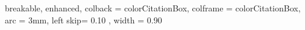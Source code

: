 {
  breakable,
  enhanced,
  colback  = colorCitationBox,
  colframe = colorCitationBox,
  arc      = 3mm,
  left skip= 0.10 \linewidth,
  width    = 0.90 \linewidth
}



